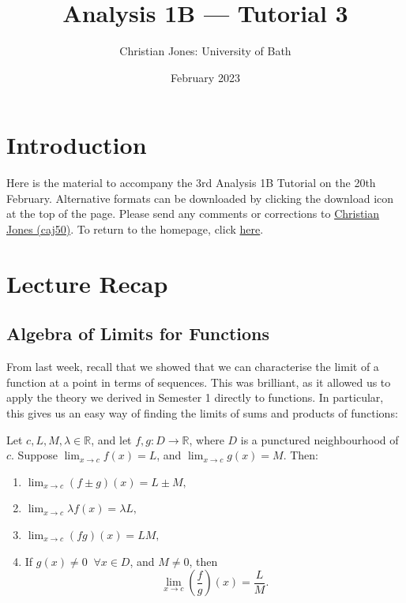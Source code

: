 \documentclass[
  10pt,
  a4paper]{article}
\title{Analysis 1B --- Tutorial 3}
\author{Christian Jones: University of Bath}
\date{February 2023}
\theoremstyle{plain}
\theoremstyle{definition}
\theoremstyle{plain}
\theoremstyle{plain}
\theoremstyle{plain}
\theoremstyle{plain}
\theoremstyle{definition}
\theoremstyle{definition}
\theoremstyle{remark}
\theoremstyle{remark}
\let\BeginKnitrBlock\begin \let\EndKnitrBlock\end
\begin{document}
\maketitle

{
\setcounter{tocdepth}{2}
\tableofcontents
}
\newpage
{}

\hypertarget{introduction}{%
\section*{Introduction}\label{introduction}}

Here is the material to accompany the 3rd Analysis 1B Tutorial on the 20th February. Alternative formats can be downloaded by clicking the download icon at the top of the page. Please send any comments or corrections to \href{mailto:caj50@bath.ac.uk}{Christian Jones (caj50)}. To return to the homepage, click \href{http://caj50.github.io/tutoring.html}{here}.

\hypertarget{lecture-recap}{%
\section{Lecture Recap}\label{lecture-recap}}

\hypertarget{algebra-of-limits-for-functions}{%
\subsection{Algebra of Limits for Functions}\label{algebra-of-limits-for-functions}}

From last week, recall that we showed that we can characterise the limit of a function at a point in terms of sequences. This was brilliant, as it allowed us to apply the theory we derived in Semester 1 directly to functions. In particular, this gives us an easy way of finding the limits of sums and products of functions:

\BeginKnitrBlock{theorem}[Algebra of Limits]
{\label{thm:thm1} }Let \(c, L, M, \lambda \in \mathbb{R}\), and let \(f,g: D \to \mathbb{R}\), where \(D\) is a punctured neighbourhood of \(c\). Suppose \(\lim_{x \to c}f(x) = L\), and \(\lim_{x \to c}g(x) = M\). Then:

\begin{enumerate}
\def\labelenumi{\arabic{enumi}.}
\item
  \(\lim_{x\to c}\left(f \pm g\right)(x) = L \pm M,\)
\item
  \(\lim_{x \to c}\lambda f(x) = \lambda L,\)
\item
  \(\lim_{x \to c}(fg)(x) = LM,\)
\item
  If \(g(x) \neq 0 \;\;\forall x \in D\), and \(M \neq 0\), then \[\lim_{x \to c}\left(\frac{f}{g}\right)(x) = \frac{L}{M}.\]
\end{enumerate}
\EndKnitrBlock{theorem}
\end{document}
